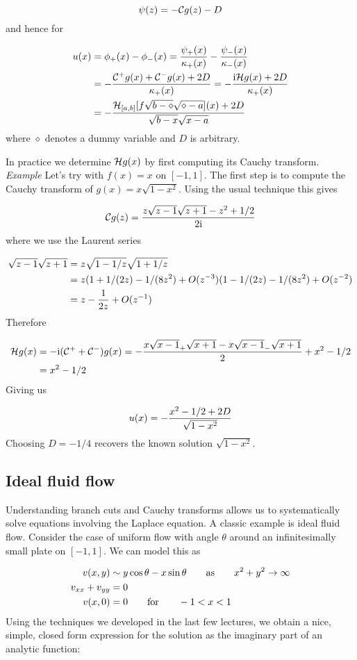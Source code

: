\documentclass[12pt,landscape]{article}
\def\qqfor{\qquad\hbox{for}\qquad}
\def\I{ {\rm i} }
\def\CC{ {\cal C} }
\def\HH{ {\cal H} }
\def\addtab#1={#1\;&=}
\def\ccr{\\\addtab}
\def\addtab#1={#1\;&=}
\def\ccr{\\\addtab}
\begin{document}
{\[
\psi(z) = -\CC g(z) - D
\]
and hence for


\begin{align*}
u(x) &= \phi_+(x) - \phi_-(x) = {\psi_+(x)\over \kappa_+(x)} - {\psi_-(x)\over \kappa_-(x)} \\
&= -{\CC^+ g(x) + \CC^- g(x) + 2 D \over \kappa_+(x)}
= -{\I \HH g(x) + 2D \over \kappa_+(x)}\\
& = -{\HH_{[a,b]}[f \sqrt{b-\diamond}\sqrt{\diamond-a}](x) + 2 D \over \sqrt{b-x} \sqrt{x-a}}
\end{align*}
where $\diamond$ denotes a dummy variable and $D$ is arbitrary.

In practice we determine $\HH g(x)$ by first computing its Cauchy transform.
\newpage
\emph{Example} Let's try with $f(x) = x$ on $[-1,1]$. The first step is to compute the Cauchy transform of $g(x) = x \sqrt{1-x^2}$. Using the usual technique this gives

\[
\CC g(z) = {z \sqrt{z-1} \sqrt{z+1} - z^2 +1/2 \over 2 \I}
\]
where we use the Laurent series


\begin{align*}
\sqrt{z-1} \sqrt{z+1} &= z \sqrt{1-1/z} \sqrt{1 + 1/z} \ccr
= z (1+1/(2z) - 1/(8 z^2) + O(z^{-3})(1-1/(2z)  - 1/(8 z^2) + O(z^{-2}) \ccr
= z -{1 \over 2 z} + O(z^{-1})
\end{align*}
Therefore


\begin{align*}
\HH g(x) &= -\I (\CC^+ + \CC^-) g(x) = - {x \sqrt{x-1}_+ \sqrt{x+1} - x \sqrt{x-1}_- \sqrt{x+1} \over 2} + x^2 - 1/2 \ccr
= x^2 - 1/2
\end{align*}
Giving us

\[
u(x) = -{x^2 - 1/2 + 2 D \over \sqrt{1-x^2}}
\]
Choosing $D = -1/4$ recovers the known solution $\sqrt{1-x^2}$.

\subsection{Ideal fluid flow}
Understanding branch cuts and Cauchy transforms allows us to systematically solve equations involving the Laplace equation. A classic example is ideal fluid flow. Consider the case of uniform flow with angle $\theta$ around an infinitesimally small plate on $[-1,1]$. We can model this as


\begin{align*}
v(x,y) &\sim y \cos \theta - x \sin \theta \qquad\hbox{as}\qquad x^2 + y^2 \to \infty \\
v_{xx} + v_{yy} &= 0 \\
v(x,0) & = 0 \qqfor -1 < x <1
\end{align*}
Using the techniques we developed in the last few lectures, we obtain a nice, simple, closed form expression for the solution as the imaginary part of an analytic function:


}
\end{document}
